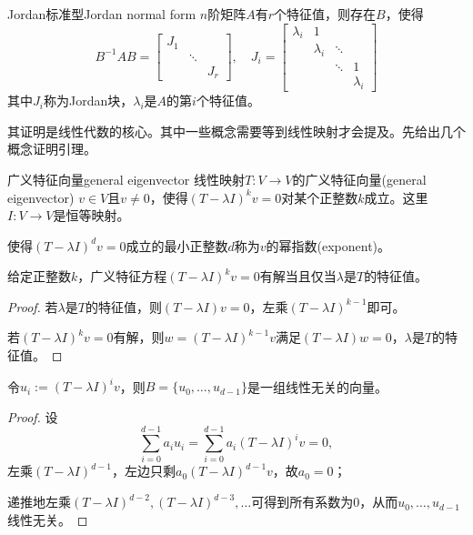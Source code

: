 \begin{theorem}{Jordan标准型}{Jordan normal form}
	$n$阶矩阵$A$有$r$个特征值，则存在$B$，使得
	\[
		B^{-1}AB=\begin{bmatrix}
			J_1             \\
			 & \ddots       \\
			 &        & J_r
		\end{bmatrix},\quad
		J_i=\begin{bmatrix}
			\lambda_i & 1                              \\
			          & \lambda_i & \ddots             \\
			          &           & \ddots & 1         \\
			          &           &        & \lambda_i
		\end{bmatrix}
	\]
	其中$J_i$称为Jordan块，$\lambda_i$是$A$的第$i$个特征值。
\end{theorem}
其证明是线性代数的核心。其中一些概念需要等到线性映射才会提及。先给出几个概念证明引理。
\begin{definition}{广义特征向量}{general eigenvector}
	线性映射$T:V\to V$的广义特征向量(general eigenvector) $v\in V$且$v\neq 0$，使得$(T-\lambda I)^kv=0$对某个正整数$k$成立。这里$I:V\to V$是恒等映射。

	使得$(T-\lambda I)^dv=0$成立的最小正整数$d$称为$v$的幂指数(exponent)。
\end{definition}
\begin{theorem}{}{}
	给定正整数$k$，广义特征方程$(T-\lambda I)^kv=0$有解当且仅当$\lambda$是$T$的特征值。
\end{theorem}
\begin{proof}
	若$\lambda$是$T$的特征值，则$(T-\lambda I)v=0$，左乘$(T-\lambda I)^{k-1}$即可。
	
	若$(T-\lambda I)^kv=0$有解，则$w=(T-\lambda I)^{k-1}v$满足$(T-\lambda I)w=0$，$\lambda$是$T$的特征值。
\end{proof}
\begin{theorem}{}{}
	令$u_i:=(T-\lambda I)^iv$，则$B=\{u_0,\ldots,u_{d-1}\}$是一组线性无关的向量。
\end{theorem}
\begin{proof}
	设
	\[
		\sum_{i=0}^{d-1}a_iu_i=\sum_{i=0}^{d-1}a_i(T-\lambda I)^iv=0,
	\]
	左乘$(T-\lambda I)^{d-1}$，左边只剩$a_0(T-\lambda I)^{d-1}v$，故$a_0=0$；
	
	递推地左乘$(T-\lambda I)^{d-2},(T-\lambda I)^{d-3},\ldots$可得到所有系数为0，从而$u_0,\ldots,u_{d-1}$线性无关。
\end{proof}
